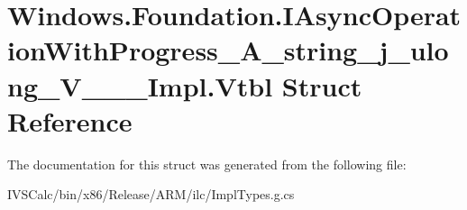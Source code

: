 \hypertarget{struct_windows_1_1_foundation_1_1_i_async_operation_with_progress___a__string__j__ulong___v_______impl_1_1_vtbl}{}\section{Windows.\+Foundation.\+I\+Async\+Operation\+With\+Progress\+\_\+\+A\+\_\+string\+\_\+j\+\_\+ulong\+\_\+\+V\+\_\+\+\_\+\+\_\+\+Impl.\+Vtbl Struct Reference}
\label{struct_windows_1_1_foundation_1_1_i_async_operation_with_progress___a__string__j__ulong___v_______impl_1_1_vtbl}


The documentation for this struct was generated from the following file\+:\begin{DoxyCompactItemize}
\item 
I\+V\+S\+Calc/bin/x86/\+Release/\+A\+R\+M/ilc/Impl\+Types.\+g.\+cs\end{DoxyCompactItemize}
